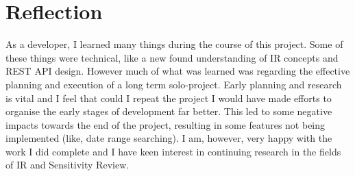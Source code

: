 \documentclass{l4proj}
\begin{document}
\section{Reflection}
As a developer, I learned many things during the course of this project. Some of these things were technical, like a new found understanding of IR concepts and REST API design. However much of what was learned was regarding the effective planning and execution of a long term solo-project. Early planning and research is vital and I feel that could I repeat the project I would have made efforts to organise the early stages of development far better. This led to some negative impacts towards the end of the project, resulting in some features not being implemented (like, date range searching). I am, however, very happy with the work I did complete and I have keen interest in continuing research in the fields of IR and Sensitivity Review.
\end{document}
